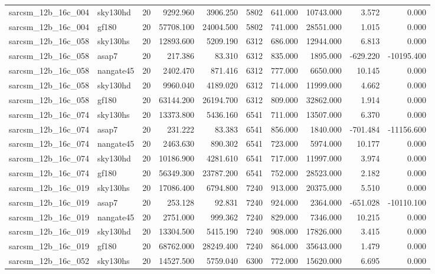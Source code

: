 \documentclass{article}
\begin{document}
\begin{longtable}{llrrrrrrrr}
sarcsm\_12b\_16c\_004 & sky130hd & 20 & 9292.960 & 3906.250 & 5802 & 641.000 & 10743.000 & 3.572 & 0.000 \\
sarcsm\_12b\_16c\_004 & gf180 & 20 & 57708.100 & 24004.500 & 5802 & 741.000 & 28551.000 & 1.015 & 0.000 \\
sarcsm\_12b\_16c\_058 & sky130hs & 20 & 12893.600 & 5209.190 & 6312 & 686.000 & 12944.000 & 6.813 & 0.000 \\
sarcsm\_12b\_16c\_058 & asap7 & 20 & 217.386 & 83.310 & 6312 & 835.000 & 1895.000 & -629.220 & -10195.400 \\
sarcsm\_12b\_16c\_058 & nangate45 & 20 & 2402.470 & 871.416 & 6312 & 777.000 & 6650.000 & 10.145 & 0.000 \\
sarcsm\_12b\_16c\_058 & sky130hd & 20 & 9960.040 & 4189.020 & 6312 & 714.000 & 11999.000 & 4.662 & 0.000 \\
sarcsm\_12b\_16c\_058 & gf180 & 20 & 63144.200 & 26194.700 & 6312 & 809.000 & 32862.000 & 1.914 & 0.000 \\
sarcsm\_12b\_16c\_074 & sky130hs & 20 & 13373.800 & 5436.160 & 6541 & 711.000 & 13507.000 & 6.370 & 0.000 \\
sarcsm\_12b\_16c\_074 & asap7 & 20 & 231.222 & 83.383 & 6541 & 856.000 & 1840.000 & -701.484 & -11156.600 \\
sarcsm\_12b\_16c\_074 & nangate45 & 20 & 2463.630 & 890.302 & 6541 & 723.000 & 5974.000 & 10.177 & 0.000 \\
sarcsm\_12b\_16c\_074 & sky130hd & 20 & 10186.900 & 4281.610 & 6541 & 717.000 & 11997.000 & 3.974 & 0.000 \\
sarcsm\_12b\_16c\_074 & gf180 & 20 & 56349.300 & 23787.200 & 6541 & 752.000 & 28523.000 & 2.182 & 0.000 \\
sarcsm\_12b\_16c\_019 & sky130hs & 20 & 17086.400 & 6794.800 & 7240 & 913.000 & 20375.000 & 5.510 & 0.000 \\
sarcsm\_12b\_16c\_019 & asap7 & 20 & 253.128 & 92.831 & 7240 & 924.000 & 2364.000 & -651.028 & -10110.100 \\
sarcsm\_12b\_16c\_019 & nangate45 & 20 & 2751.000 & 999.362 & 7240 & 829.000 & 7346.000 & 10.215 & 0.000 \\
sarcsm\_12b\_16c\_019 & sky130hd & 20 & 13304.500 & 5415.190 & 7240 & 908.000 & 17826.000 & 3.415 & 0.000 \\
sarcsm\_12b\_16c\_019 & gf180 & 20 & 68762.000 & 28249.400 & 7240 & 864.000 & 35643.000 & 1.479 & 0.000 \\
sarcsm\_12b\_16c\_052 & sky130hs & 20 & 14527.500 & 5759.040 & 6300 & 772.000 & 15620.000 & 6.695 & 0.000 \\

\end{longtable}
\end{document}
